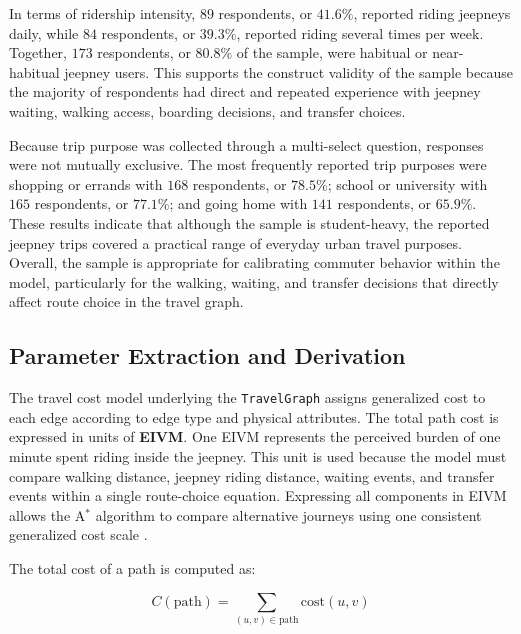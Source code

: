 {In terms of ridership intensity, \(89\) respondents, or \(41.6\%\), reported riding jeepneys daily, while \(84\) respondents, or \(39.3\%\), reported riding several times per week. Together, \(173\) respondents, or \(80.8\%\) of the sample, were habitual or near-habitual jeepney users. This supports the construct validity of the sample because the majority of respondents had direct and repeated experience with jeepney waiting, walking access, boarding decisions, and transfer choices.

Because trip purpose was collected through a multi-select question, responses were not mutually exclusive. The most frequently reported trip purposes were shopping or errands with \(168\) respondents, or \(78.5\%\); school or university with \(165\) respondents, or \(77.1\%\); and going home with \(141\) respondents, or \(65.9\%\). These results indicate that although the sample is student-heavy, the reported jeepney trips covered a practical range of everyday urban travel purposes. Overall, the sample is appropriate for calibrating commuter behavior within the model, particularly for the walking, waiting, and transfer decisions that directly affect route choice in the travel graph.

\subsection{Parameter Extraction and Derivation}
\label{subsec:3.1.4 parameter extraction and derivation}
The travel cost model underlying the \texttt{TravelGraph} assigns generalized cost to each edge according to edge type and physical attributes. The total path cost is expressed in units of \textbf{\ac{EIVM}}. One \ac{EIVM} represents the perceived burden of one minute spent riding inside the jeepney. This unit is used because the model must compare walking distance, jeepney riding distance, waiting events, and transfer events within a single route-choice equation. Expressing all components in \ac{EIVM} allows the A$^{*}$ algorithm to compare alternative journeys using one consistent generalized cost scale \cite{ortuzar2011modelling}.

The total cost of a path is computed as:

\[
C(\text{path}) = \sum_{(u,v) \in \text{path}} \text{cost}(u,v)
\]

}
